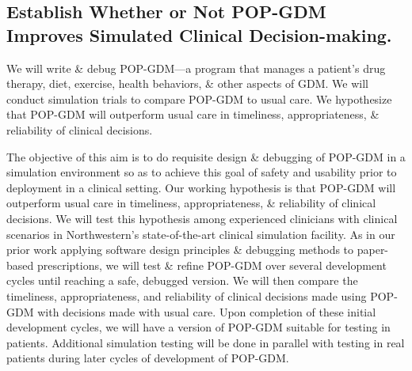 \subsection{Establish Whether or Not POP-GDM Improves Simulated  Clinical Decision-making.}\label{sec:popgdm}
We will write \& debug POP-GDM---a \poppl{} program that manages a
patient's drug therapy, diet, exercise, health behaviors, \& other
aspects of GDM. We will conduct simulation trials to compare POP-GDM
to usual care. We hypothesize that POP-GDM will outperform usual care
in timeliness, appropriateness, \& reliability of clinical decisions.

The objective of this aim is to do requisite design \& debugging of
POP-GDM in a simulation environment so as to achieve this goal of
safety and usability prior to deployment in a clinical setting. Our
working hypothesis is that POP-GDM will outperform usual care in
timeliness, appropriateness, \& reliability of clinical decisions. We
will test this hypothesis among experienced clinicians with clinical
scenarios in Northwestern's state-of-the-art clinical simulation
facility. As in our prior work applying software design principles \&
debugging methods to paper-based prescriptions, we will test \& refine
POP-GDM over several development cycles until
reaching a safe, debugged version. We will then compare the timeliness, appropriateness, and
reliability of clinical decisions made using POP-GDM with decisions
made with usual care. Upon completion of these initial development
cycles, we will have a version of POP-GDM suitable for testing in
patients. Additional simulation testing will be done in parallel with
testing in real patients during later cycles of development of
POP-GDM.

